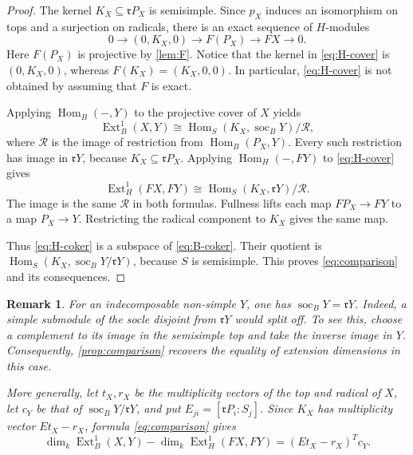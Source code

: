 \documentclass[a4paper,reqno]{amsart}
\numberwithin{equation}{section}
\newtheorem{remark}[remark]{Remark}
\newcommand{\Ext}{\operatorname{Ext}}
\newcommand{\Hom}{\operatorname{Hom}}
\newcommand{\soc}{\operatorname{soc}}
\begin{document}
\begin{proof}
The kernel $K_X\subseteq\mathfrak rP_X$ is semisimple. Since $p_X$
induces an isomorphism on tops and a surjection on radicals, there
is an exact sequence of $H$-modules
\begin{equation}\label{eq:H-cover}
 0\longrightarrow(0,K_X,0)\longrightarrow F(P_X)
 \longrightarrow FX\longrightarrow0.
\end{equation}
Here $F(P_X)$ is projective by \cref{lem:F}. Notice that the kernel
in \eqref{eq:H-cover} is $(0,K_X,0)$, whereas $F(K_X)=(K_X,0,0)$.
In particular, \eqref{eq:H-cover} is not obtained by assuming that
$F$ is exact.

Applying $\Hom_B(-,Y)$ to the projective cover of $X$ yields
\begin{equation}\label{eq:B-coker}
 \Ext_B^1(X,Y)\cong
 \Hom_S(K_X,\soc_B Y)/\mathcal R,
\end{equation}
where $\mathcal R$ is the image of restriction from
$\Hom_B(P_X,Y)$. Every such restriction has image in
$\mathfrak rY$, because $K_X\subseteq\mathfrak rP_X$.
Applying $\Hom_H(-,FY)$ to \eqref{eq:H-cover} gives
\begin{equation}\label{eq:H-coker}
 \Ext_H^1(FX,FY)\cong
 \Hom_S(K_X,\mathfrak rY)/\mathcal R.
\end{equation}
The image is the same $\mathcal R$ in both formulas. Fullness lifts
each map $FP_X\to FY$ to a map $P_X\to Y$. Restricting the
radical component to $K_X$ gives the same map.

Thus \eqref{eq:H-coker} is a subspace of \eqref{eq:B-coker}.
Their quotient is $\Hom_S(K_X,\soc_B Y/\mathfrak rY)$, because $S$
is semisimple. This proves \eqref{eq:comparison} and its consequences.
\end{proof}

\begin{remark}\label{rem:dimension}
For an indecomposable non-simple $Y$, one has
$\soc_B Y=\mathfrak rY$. Indeed, a simple submodule of the socle
disjoint from $\mathfrak rY$ would split off. To see this, choose a
complement to its image in the semisimple top and take the inverse image
in $Y$.
Consequently, \cref{prop:comparison} recovers the equality of
extension dimensions in this case.

More generally, let $t_X,r_X$ be the multiplicity vectors of the top
and radical of $X$, let $c_Y$ be that of $\soc_B Y/\mathfrak rY$,
and put $E_{ji}=[\mathfrak rP_i:S_j]$. Since $K_X$ has multiplicity
vector $Et_X-r_X$, formula \eqref{eq:comparison} gives
\[
\dim_k\Ext_B^1(X,Y)-\dim_k\Ext_H^1(FX,FY)
 =(Et_X-r_X)^Tc_Y.
\]
\end{remark}
\end{document}
